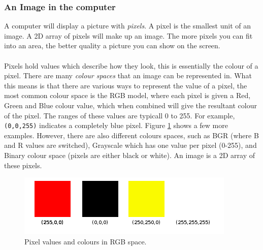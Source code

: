 \documentclass[11pt]{article}
\begin{document}
\subsubsection{An Image in the computer}
A computer will display a picture with \textit{pixels}. A pixel is the
smallest unit of an image. A 2D array of pixels will make up an image.
The more pixels you can fit into an area, the better quality a picture
you can show on the screen.\\
\\
Pixels hold values which describe how they look, this is
essentially the colour of a pixel. There are many \textit{colour spaces} that
an image can be represented in. What this means is that there are
various ways to represent the value of a pixel, the most common colour
space is the RGB model, where each pixel is given a Red, Green and Blue
colour value, which when combined will give the resultant colour of the
pixel. The ranges of these values are typicall 0 to 255. 
For example, \texttt{(0,0,255)} indicates a completely blue pixel. 
Figure \ref{fig:pixels} shows a few more examples. However, there are 
also different colours spaces, such as BGR (where B and R values are
switched), Grayscale which has one value per pixel (0-255), and Binary
colour space (pixels are either black or white).
An image is a 2D array of these pixels.

\begin{figure}
	\centering
	\includegraphics[scale=0.9]{pics/pixels.png}
	\caption{Pixel values and colours in RGB space.}
	\label{fig:pixels}
\end{figure}
\end{document}
